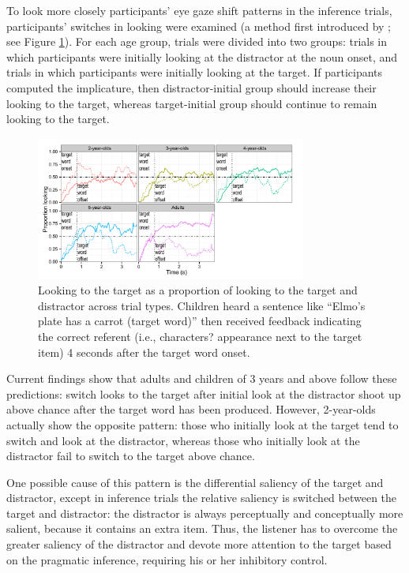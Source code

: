 \documentclass[10pt,letterpaper]{article}
\begin{document}
To look more closely participants' eye gaze shift patterns in the inference trials, participants' switches in looking were examined (a method first introduced by ; see Figure \ref{fig:onset}).  For each age group, trials were divided into two groups: trials in which participants were initially looking at the distractor at the noun onset, and trials in which participants were initially looking at the target.  If participants computed the implicature, then distractor-initial group should increase their looking to the target, whereas target-initial group should continue to remain looking to the target. 

\begin{figure}
\begin{center} 
\includegraphics[width=3.5in]{figures/140521-simpimp_age_targAtOnset-edit.pdf}
\caption{\label{fig:onset} Looking to the target as a proportion of looking to the target and distractor across trial types. Children heard a sentence like ``Elmo's plate has a carrot (target word)'' then received feedback indicating the correct referent (i.e., characters? appearance next to the target item) 4 seconds after the target word onset.}
\end{center} 
\end{figure}

Current findings show that adults and children of 3 years and above follow these predictions: switch looks to the target after initial look at the distractor shoot up above chance after the target word has been produced. However, 2-year-olds actually show the opposite pattern: those who initially look at the target tend to switch and look at the distractor, whereas those who initially look at the distractor fail to switch to the target above chance. 

One possible cause of this pattern is the differential saliency of the target and distractor, except in inference trials the relative saliency is switched between the target and distractor: the distractor is always perceptually and conceptually more salient, because it contains an extra item. Thus, the listener has to overcome the greater saliency of the distractor and devote more attention to the target based on the pragmatic inference, requiring his or her inhibitory control. 
\end{document}
